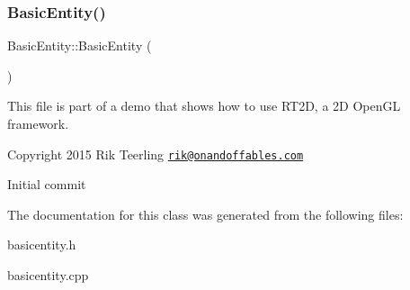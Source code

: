\subsubsection{\texorpdfstring{Basic\+Entity()}{BasicEntity()}}
{\footnotesize\ttfamily Basic\+Entity\+::\+Basic\+Entity (\begin{DoxyParamCaption}{ }\end{DoxyParamCaption})}

This file is part of a demo that shows how to use R\+T2D, a 2D Open\+GL framework.


\begin{DoxyItemize}
\item Copyright 2015 Rik Teerling \href{mailto:rik@onandoffables.com}{\tt rik@onandoffables.\+com}
\begin{DoxyItemize}
\item Initial commit 
\end{DoxyItemize}
\end{DoxyItemize}

The documentation for this class was generated from the following files\+:\begin{DoxyCompactItemize}
\item 
basicentity.\+h\item 
basicentity.\+cpp\end{DoxyCompactItemize}
